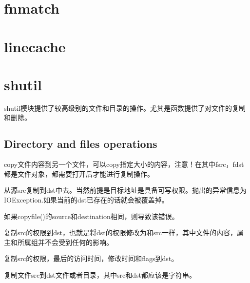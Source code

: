 \section{fnmatch}





\section{linecache}





\section{shutil}
shutil模块提供了较高级别的文件和目录的操作。尤其是函数提供了对文件的复制和删除。
\subsection{Directory and files operations}
\noindent{\color{red}{shutil.copyfileobj(fsrc, fdst[, length]):}}
\par{copy文件内容到另一个文件，可以copy指定大小的内容，注意！在其中fsrc，fdst都是文件对象，都需要打开后才能进行复制操作。}\\

\noindent{\color{red}{shutil.copyfile(src, dst, *, follow\_sysmlinks=True):}}
\par{从源src复制到dst中去。当然前提是目标地址是具备可写权限。抛出的异常信息为IOException.如果当前的dst已存在的话就会被覆盖掉。}\\

\noindent{\color{red}{shutil.SameFileError:}}
\par{如果copyfile()的source和destination相同，则导致该错误。}\\

\noindent{\color{red}{shutil.copymode(src, dst, *, follow\_sysmlinks=True):}}
\par{复制src的权限到dst，也就是将dst的权限修改为和src一样，其中文件的内容，属主和所属组并不会受到任何的影响。}\\

\noindent{\color{red}{shutil.copystat(src, dst, *, follow\_sysmlinks=True):}}
\par{复制src的权限，最后的访问时间，修改时间和flags到dst。}\\

\noindent{\color{red}{shutil.copy(src, dst, *, follow\_sysmlinks=True):}}
\par{复制文件src到dst文件或者目录，其中src和dst都应该是字符串。}\\

